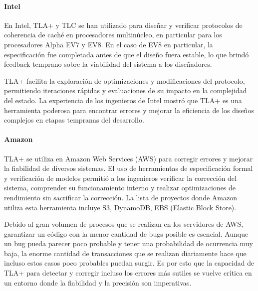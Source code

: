 \documentclass[runningheads]{llncs}
\begin{document}
\paragraph{Intel}
En Intel, TLA+ y TLC se han utilizado para diseñar y verificar protocolos de coherencia de caché en procesadores multinúcleo, en particular para los procesadores Alpha EV7 y EV8. En el caso de EV8 en particular, la especificación fue completada antes de que el diseño fuera estable, lo que brindó feedback temprano sobre la viabilidad del sistema a los diseñadores.

TLA+ facilita la exploración de optimizaciones y modificaciones del protocolo, permitiendo iteraciones rápidas y evaluaciones de su impacto en la complejidad del estado. La experiencia de los ingenieros de Intel mostró que TLA+ es una herramienta poderosa para encontrar errores y mejorar la eficiencia de los diseños complejos en etapas tempranas del desarrollo.

\paragraph{Amazon}
TLA+ se utiliza en Amazon Web Services (AWS) para corregir errores y mejorar la fiabilidad de diversos sistemas. El uso de herramientas de especificación formal y verificación de modelos permitió a los ingenieros verificar la corrección del sistema, comprender su funcionamiento interno y realizar optimizaciones de rendimiento sin sacrificar la corrección. La lista de proyectos donde Amazon utiliza esta herramienta incluye S3, DynamoDB, EBS (Elastic Block Store).

Debido al gran volumen de procesos que se realizan en los servidores de AWS, garantizar un código con la menor cantidad de bugs posible es esencial. Aunque un bug pueda parecer poco probable y tener una probabilidad de ocurrencia muy baja, la enorme cantidad de transacciones que se realizan diariamente hace que incluso estos casos poco probables puedan surgir. Es por esto que la capacidad de TLA+ para detectar y corregir incluso los errores más sutiles se vuelve crítica en un entorno donde la fiabilidad y la precisión son imperativas.
\end{document}
